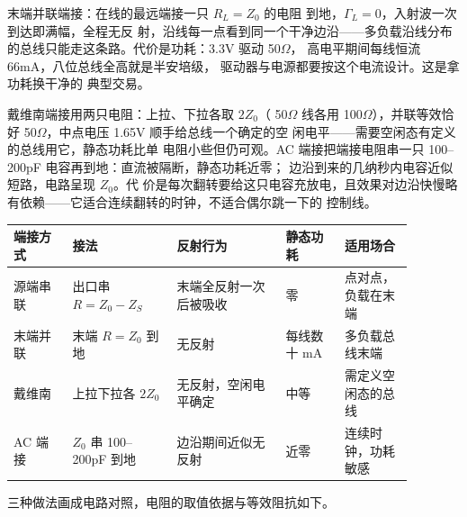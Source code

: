 末端并联端接：在线的最远端接一只 $R_L=Z_0$ 的电阻
到地，$\Gamma_L=0$，入射波一次到达即满幅，全程无反
射，沿线每一点看到同一个干净边沿——多负载沿线分布
的总线只能走这条路。代价是功耗：3.3V 驱动 50$\Omega$，
高电平期间每线恒流 66mA，八位总线全高就是半安培级，
驱动器与电源都要按这个电流设计。这是拿功耗换干净的
典型交易。

戴维南端接用两只电阻：上拉、下拉各取 $2Z_0$（
50$\Omega$ 线各用 100$\Omega$），并联等效恰好
50$\Omega$，中点电压 1.65V 顺手给总线一个确定的空
闲电平——需要空闲态有定义的总线用它，静态功耗比单
电阻小些但仍可观。AC 端接把端接电阻串一只
100--200pF 电容再到地：直流被隔断，静态功耗近零；
边沿到来的几纳秒内电容近似短路，电路呈现 $Z_0$。代
价是每次翻转要给这只电容充放电，且效果对边沿快慢略
有依赖——它适合连续翻转的时钟，不适合偶尔跳一下的
控制线。

\begin{longtable}{L{0.13\linewidth}L{0.23\linewidth}L{0.24\linewidth}L{0.13\linewidth}L{0.15\linewidth}}
\toprule
端接方式 & 接法 & 反射行为 & 静态功耗 & 适用场合 \\
\midrule
源端串联 & 出口串 $R=Z_0-Z_S$ & 末端全反射一次后被吸收 & 零 & 点对点，负载在末端 \\\tablerowrule
末端并联 & 末端 $R=Z_0$ 到地 & 无反射 & 每线数十 mA & 多负载总线末端 \\\tablerowrule
戴维南 & 上拉下拉各 $2Z_0$ & 无反射，空闲电平确定 & 中等 & 需定义空闲态的总线 \\\tablerowrule
AC 端接 & $Z_0$ 串 100--200pF 到地 & 边沿期间近似无反射 & 近零 & 连续时钟，功耗敏感 \\
\bottomrule
\end{longtable}

三种做法画成电路对照，电阻的取值依据与等效阻抗如下。

